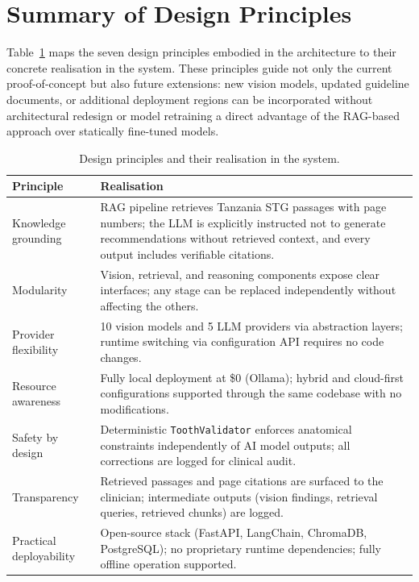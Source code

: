 \documentclass[12pt,a4paper]{report}
\begin{document}
	\section{Summary of Design Principles}
	\label{sec:principles}
	
	Table~\ref{tab:principles} maps the seven design principles embodied in the architecture to
	their concrete realisation in the system. These principles guide not only the current
	proof-of-concept but also future extensions: new vision models, updated guideline documents,
	or additional deployment regions can be incorporated without architectural redesign or model
	retraining a direct advantage of the RAG-based approach over statically fine-tuned models.
	
	\begin{table}[H]
		\centering
		\caption{Design principles and their realisation in the system.}
		\label{tab:principles}
		{\small
			\begin{tabular}{p{3.0cm}p{9.5cm}}
				\toprule
				\textbf{Principle} & \textbf{Realisation} \\
				\midrule
				Knowledge grounding
				& RAG pipeline retrieves Tanzania STG passages with page numbers; the LLM is explicitly
				instructed not to generate recommendations without retrieved context, and every output
				includes verifiable citations. \\[4pt]
				Modularity
				& Vision, retrieval, and reasoning components expose clear interfaces; any stage can be
				replaced independently without affecting the others. \\[4pt]
				Provider flexibility
				& 10 vision models and 5 LLM providers via abstraction layers; runtime switching via
				configuration API requires no code changes. \\[4pt]
				Resource awareness
				& Fully local deployment at \$0 (Ollama); hybrid and cloud-first configurations
				supported through the same codebase with no modifications. \\[4pt]
				Safety by design
				& Deterministic \texttt{ToothValidator} enforces anatomical constraints independently of
				AI model outputs; all corrections are logged for clinical audit. \\[4pt]
				Transparency
				& Retrieved passages and page citations are surfaced to the clinician; intermediate
				outputs (vision findings, retrieval queries, retrieved chunks) are logged. \\[4pt]
				Practical deployability
				& Open-source stack (FastAPI, LangChain, ChromaDB, PostgreSQL); no proprietary runtime
				dependencies; fully offline operation supported. \\
				\bottomrule
			\end{tabular}
		}
	\end{table}
	
\end{document}
